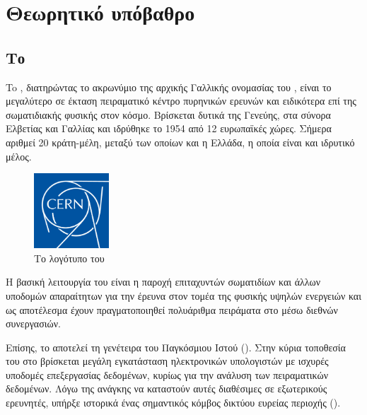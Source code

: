 \chapter{Θεωρητικό υπόβαθρο}

\section{Το }

To , διατηρώντας το ακρωνύμιο της αρχικής Γαλλικής ονομασίας του , είναι το μεγαλύτερο σε έκταση πειραματικό κέντρο πυρηνικών ερευνών και ειδικότερα επί της σωματιδιακής φυσικής στον κόσμο. 
Βρίσκεται δυτικά της Γενεύης, στα σύνορα Ελβετίας και Γαλλίας και ιδρύθηκε το 1954 από 12 ευρωπαϊκές χώρες. 
Σήμερα αριθμεί 20 κράτη-μέλη, μεταξύ των οποίων και η Ελλάδα, η οποία είναι και ιδρυτικό μέλος.

\begin{figure}[h]
\includegraphics[width=0.25\textwidth]{images/CERNlogo.png}
\centering
\caption{Το λογότυπο του }
\label{img:CERNlogo}
\end{figure}

Η βασική λειτουργία του  είναι η παροχή επιταχυντών σωματιδίων και άλλων υποδομών απαραίτητων για την έρευνα στον τομέα της φυσικής υψηλών ενεργειών και ως αποτέλεσμα έχουν πραγματοποιηθεί πολυάριθμα πειράματα στο  μέσω διεθνών συνεργασιών.

Επίσης, το  αποτελεί τη γενέτειρα του Παγκόσμιου Ιστού ().
Στην κύρια τοποθεσία του στο  βρίσκεται μεγάλη εγκατάσταση ηλεκτρονικών υπολογιστών με ισχυρές υποδομές επεξεργασίας δεδομένων, κυρίως για την ανάλυση των πειραματικών δεδομένων. 
Λόγω της ανάγκης να καταστούν αυτές διαθέσιμες σε εξωτερικούς ερευνητές, υπήρξε ιστορικά ένας σημαντικός κόμβος δικτύου ευρείας περιοχής ().


